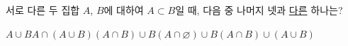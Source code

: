 서로 다른 두 집합 $A$, $B$에 대하여 $A\subset B$일 때, 다음 중 나머지 넷과 \underline{다른} 하나는?
\begin{choicesii}{$A\cup B$}{$A\cap(A\cup B)$}{$(A\cap B)\cup B$}{$(A\cap\varnothing)\cup B$}{$(A\cap B)\cup(A\cup B)$}\end{choicesii}
